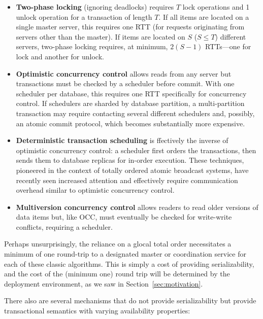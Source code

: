 \begin{itemize}
\item \textbf{Two-phase locking} (ignoring deadlocks) requires $T$
  lock operations and 1 unlock operation for a transaction of length
  $T$. If all items are located on a single master server, this
  requires one RTT (for requests originating from servers other than
  the master). If items are located on $S$ ($S \leq T$) different
  servers, two-phase locking requires, at minimum, $2(S-1)$ RTTs---one
  for lock and another for unlock.

\item \textbf{Optimistic concurrency control} allows reads from any
  server but transactions must be checked by a scheduler before
  commit. With one scheduler per database, this requires one RTT
  specifically for concurrency control. If schedulers are sharded by
  database partition, a multi-partition transaction may require
  contacting several different schedulers and, possibly, an atomic
  commit protocol, which becomes substantially more expensive.

\item \textbf{Deterministic transaction scheduling} is ffectively the
  inverse of optimistic concurrency control: a scheduler first orders
  the transactions, then sends them to database replicas for in-order
  execution. These techniques, pioneered in the context of totally
  ordered atomic broadcast systems, have recently seen increased
  attention and effectively require communication overhead similar to
  optimistic concurrency control.

\item\textbf{Multiversion concurrency control} allows readers to read
  older versions of data items but, like OCC, must eventually be
  checked for write-write conflicts, requiring a scheduler.

\end{itemize}

Perhaps unsurprisingly, the reliance on a glocal total order
necessitates a minimum of one round-trip to a designated master or
coordination service for each of these classic algorithms. This is
simply a cost of providing serializability, and the cost of the
(minimum one) round trip will be determined by the deployment
environment, as we saw in Section~\ref{sec:motivation}.

There also are several mechanisms that do not provide serializability
but provide transactional semantics with varying availability
properties:

